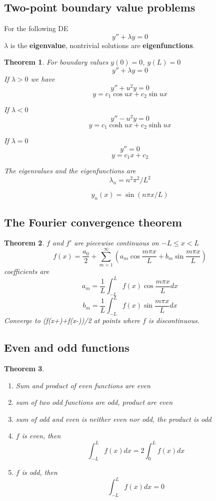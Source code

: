 \documentclass[letter]{article}
\newtheorem{theorem}{Theorem}[section]
\newenvironment{definition}[1][Definition]{\begin{trivlist}
\item[\hskip \labelsep {\bfseries #1}]}{\end{trivlist}}
\begin{document}
\subsection{Two-point boundary value problems}
\begin{definition}
For the following DE
\[ y'' + \lambda y = 0 \]
$\lambda$ is the \textbf{eigenvalue}, nontrivial solutions are \textbf{eigenfunctions}. 
\end{definition}

\begin{theorem}
For boundary values $y(0) = 0$, $y(L)=0$
\[ y'' + \lambda y = 0 \]
If $\lambda > 0$
we have 
\[ y'' + u^2 y = 0 \]
\[y = c_1 \cos ux + c_2 \sin ux\]

If $\lambda < 0$
\[ y'' - u^2 y = 0 \]
\[y = c_1 \cosh ux + c_2 \sinh ux\]

If $\lambda = 0$
\[ y''= 0 \]
\[ y = c_1 x + c_2 \]

The eigenvalues and the eigenfunctions are
\[
\lambda_n = n^2 \pi^2 /L^2
\]

\[
y_n(x) = \sin(n\pi x /L)
\]
\end{theorem}
\subsection{The Fourier convergence theorem}
\begin{theorem}
$f$ and $f'$ are piecewise continuous on $-L\leq x < L$
\[
f(x) = \frac{a_0}{2} + \sum_{m=1}^\infty (a_m \cos \frac{m\pi x}{L} + b_m \sin \frac{m\pi x}{L})
\]
coefficients are
\[
a_m = \frac{1}{L} \int_{-L}^L f(x) \cos \frac{m\pi x}{L} dx
\]
\[
b_m = \frac{1}{L} \int_{-L}^L f(x) \sin \frac{m\pi x}{L} dx
\]
Converge to (f(x+)+f(x-))/2 at points where $f$ is discontinuous.
\end{theorem}

\subsection{Even and odd functions}
\begin{theorem}
\begin{enumerate}
\item Sum and product of even functions are even
\item sum of two odd functions are odd, product are even
\item sum of odd and even is neither even nor odd, the product is odd
\item $f$ is even, then 
\[
\int_{-L}^L f(x) dx = 2 \int_0^L f(x) dx
\]
\item $f$ is odd, then 
\[
\int_{-L}^L f(x) dx = 0
\]
\end{enumerate}
\end{theorem}
\end{document}
